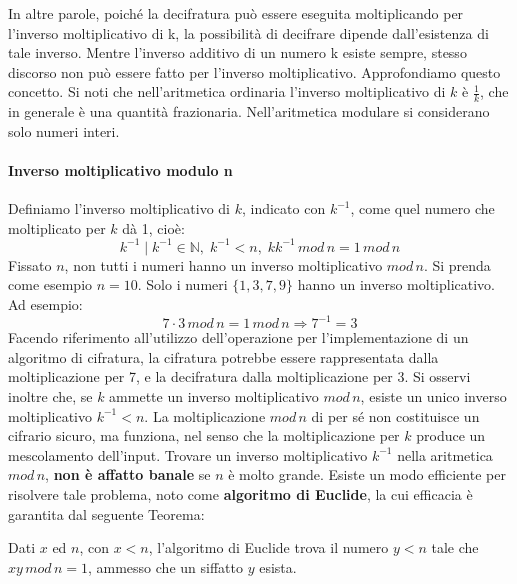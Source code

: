 \newline \newline
In altre parole, poiché la decifratura può essere eseguita moltiplicando per l'inverso moltiplicativo di k, la possibilità di decifrare dipende dall'esistenza di tale inverso. Mentre l'inverso additivo di un numero k esiste sempre, stesso discorso non può essere fatto per l'inverso moltiplicativo. Approfondiamo questo concetto. 
\newline \newline
Si noti che nell'aritmetica ordinaria l'inverso moltiplicativo di $k$ è $\frac{1}{k}$, che in generale è una quantità frazionaria. Nell'aritmetica modulare si considerano solo numeri interi.

\paragraph{Inverso moltiplicativo modulo n}
Definiamo l'inverso moltiplicativo di $k$, indicato con $k^{-1}$, come quel numero che moltiplicato per $k$ dà 1, cioè:
\begin{equation}
k^{-1} \mid k^{-1} \in \mathbb{N}, \; k^{-1} < n,\; kk^{-1} \, mod \, n = 1 \, mod \, n
\end{equation}
Fissato $n$, non tutti i numeri hanno un inverso moltiplicativo $mod \, n$. Si prenda come esempio $n = 10$. Solo i numeri $\{1,3,7,9\}$ hanno un inverso moltiplicativo. Ad esempio:
\begin{equation}
7 \cdot 3 \, mod \,n = 1 \, mod \, n \Rightarrow 7^{-1} = 3
\end{equation}
Facendo riferimento all'utilizzo dell'operazione per l'implementazione di un algoritmo di cifratura, la cifratura potrebbe essere rappresentata dalla moltiplicazione per 7, e la decifratura dalla moltiplicazione per 3.
\newline \newline
Si osservi inoltre che, se $k$ ammette un inverso moltiplicativo $mod \, n $, esiste un unico inverso moltiplicativo $k^{-1} < n$. La moltiplicazione $mod \, n$ di per sé non costituisce un cifrario sicuro, ma funziona, nel senso che la moltiplicazione per $k$ produce un mescolamento dell'input.
\newline \newline
Trovare un inverso moltiplicativo $k^{-1}$ nella aritmetica $mod \, n$, \textbf{non è affatto banale} se $n$ è molto grande. Esiste un modo efficiente per risolvere tale problema, noto come \textbf{algoritmo di Euclide}, la cui efficacia è garantita dal seguente Teorema: 
\begin{thm}[di Euclide] \label{eq:euclide}
Dati $x$ ed $n$, con $x<n$, l'algoritmo di Euclide trova il numero $y<n$ tale che $xy \, mod \, n = 1$, ammesso che un siffatto $y$ esista.
\end{thm} 


